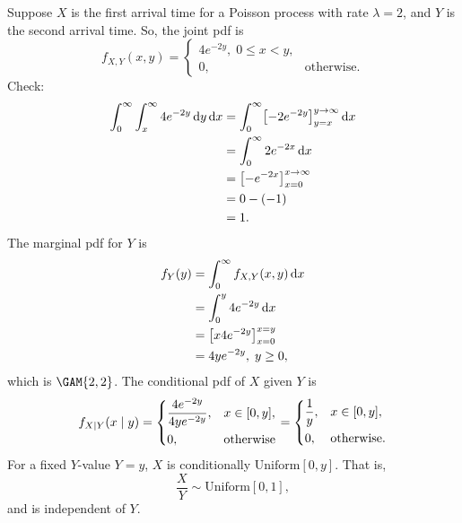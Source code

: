 \begin{Example}{}{}
    Suppose $ X $ is the first arrival time for a Poisson process with
    rate $ \lambda=2 $, and $ Y $ is the second arrival time. So, the joint
    pdf is
    \[ f_{X,Y}(x,y)=\begin{cases}
            4e^{-2y},\; 0\le x<y,  \\
            0, & \text{otherwise}.
        \end{cases} \]
    Check:
    \begin{align*}
        \int_{0}^{\infty}\int_{x}^{\infty}4e^{-2y}\odif{y}\odif{x}
         & =\int_{0}^{\infty}\bigl[-2e^{-2y}\bigr]_{y=x}^{y\to\infty}\odif{x} \\
         & =\int_{0}^{\infty}2e^{-2x}\odif{x}                                 \\
         & =\bigl[-e^{-2x}\bigr]_{x=0}^{x\to\infty}                           \\
         & =0-(-1)                                                            \\
         & =1.
    \end{align*}
    The marginal pdf for $ Y $ is
    \begin{align*}
        f_Y(y)
         & =\int_{0}^{\infty}f_{X,Y}(x,y)\odif{x} \\
         & =\int_{0}^{y}4e^{-2y}\odif{x}          \\
         & =\bigl[x4e^{-2y}\bigr]_{x=0}^{x=y}     \\
         & =4ye^{-2y},\; y\ge 0,
    \end{align*}
    which is $ \GAM{2,2} $. The conditional pdf of $ X $ given $ Y $ is
    \[ f_{X\mid Y}(x\mid y)=\begin{dcases}
            \frac{4e^{-2y}}{4ye^{-2y}}, & x\in[0,y],       \\
            0,                          & \text{otherwise}
        \end{dcases}=
        \begin{dcases}
            \frac{1}{y}, & x\in[0,y],        \\
            0,           & \text{otherwise}.
        \end{dcases}
    \]
    For a fixed $ Y $-value $ Y=y $, $ X $ is conditionally
    $ \text{Uniform}[0,y] $. That is,
    \[ \frac{X}{Y}\sim \text{Uniform}[0,1], \]
    and is independent of $ Y $.
\end{Example}